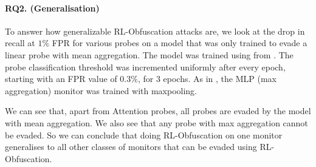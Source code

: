 \paragraph{RQ2. (Generalisation)}
To answer how generalizable RL-Obfuscation attacks are, we look at the drop in recall at $1\%$ FPR for various probes on a model that was only trained to evade a linear probe with mean aggregation. The model was trained using \setupStatic \space from . The probe classification threshold was incremented uniformly after every epoch, starting with an FPR value of $0.3\%$, for 3 epochs. As in , the MLP (max aggregation) monitor was trained with maxpooling. 

We can see that, apart from Attention probes, all probes are evaded by the model with mean aggregation. We also see that any probe with max aggregation cannot be evaded. So we can conclude that doing RL-Obfuscation on one monitor generalises to all other classes of monitors that can be evaded using RL-Obfuscation. 
